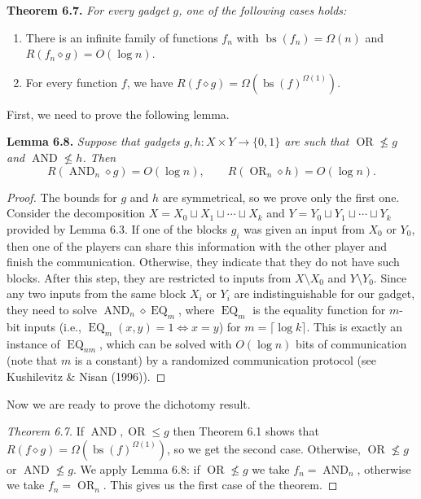 \documentclass[10pt,a4paper]{article}
\newcommand{\bits}{\{0,1\}}
\newcommand{\comp}{\diamond}
\newcommand{\OR}{\operatorname{OR}}
\newcommand{\AND}{\operatorname{AND}}
\newenvironment{originalresult}[1]{\par\medskip\noindent\textbf{#1.}\itshape}{\par\medskip}
\begin{document}
\begin{originalresult}{Theorem 6.7}
For every gadget $g$, one of the following cases holds:
\begin{enumerate}
\item[(i)] There is an infinite family of functions $f_n$ with $\operatorname{bs}(f_n)=\Omega(n)$ and $R(f_n\comp g)=O(\log n)$.
\item[(ii)] For every function $f$, we have $R(f\comp g)=\Omega(\operatorname{bs}(f)^{\Omega(1)})$.
\end{enumerate}
\end{originalresult}

First, we need to prove the following lemma.
\begin{originalresult}{Lemma 6.8}
Suppose that gadgets $g,h:X\times Y\to\bits$ are such that $\OR\nleq g$ and $\AND\nleq h$. Then
\[R(\AND_n\comp g)=O(\log n),\qquad R(\OR_n\comp h)=O(\log n).\]
\end{originalresult}
\begin{proof}
The bounds for $g$ and $h$ are symmetrical, so we prove only the first one. Consider the decomposition $X=X_0\sqcup X_1\sqcup\cdots\sqcup X_k$ and $Y=Y_0\sqcup Y_1\sqcup\cdots\sqcup Y_k$ provided by Lemma 6.3. If one of the blocks $g_i$ was given an input from $X_0$ or $Y_0$, then one of the players can share this information with the other player and finish the communication. Otherwise, they indicate that they do not have such blocks. After this step, they are restricted to inputs from $X\setminus X_0$ and $Y\setminus Y_0$. Since any two inputs from the same block $X_i$ or $Y_i$ are indistinguishable for our gadget, they need to solve $\AND_n\comp\operatorname{EQ}_m$, where $\operatorname{EQ}_m$ is the equality function for $m$-bit inputs (i.e., $\operatorname{EQ}_m(x,y)=1\iff x=y$) for $m=\lceil\log k\rceil$. This is exactly an instance of $\operatorname{EQ}_{nm}$, which can be solved with $O(\log n)$ bits of communication (note that $m$ is a constant) by a randomized communication protocol (see Kushilevitz \& Nisan (1996)).
\end{proof}
Now we are ready to prove the dichotomy result.
\begin{proof}[Theorem 6.7]
If $\AND,\OR\le g$ then Theorem 6.1 shows that $R(f\comp g)=\Omega(\operatorname{bs}(f)^{\Omega(1)})$, so we get the second case.
Otherwise, $\OR\nleq g$ or $\AND\nleq g$. We apply Lemma 6.8: if $\OR\nleq g$ we take $f_n=\AND_n$, otherwise we take $f_n=\OR_n$. This gives us the first case of the theorem.
\end{proof}
\end{document}
